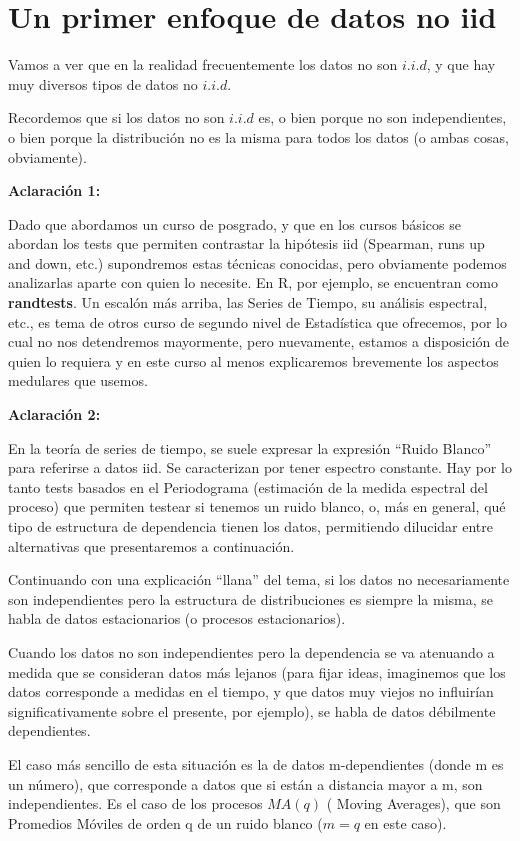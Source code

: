 \documentclass[
  oneside]{book}
\begin{document}
\section{Un primer enfoque de datos no iid}

Vamos a ver que en la realidad frecuentemente los datos no son
\(i.i.d\), y que hay muy diversos tipos de datos no \(i.i.d\).

Recordemos que si los datos no son \(i.i.d\) es, o bien porque no son
independientes, o bien porque la distribución no es la misma para todos
los datos (o ambas cosas, obviamente).

\textbf{Aclaración 1:}

Dado que abordamos un curso de posgrado, y que en los cursos básicos se
abordan los tests que permiten contrastar la hipótesis iid (Spearman,
runs up and down, etc.) supondremos estas técnicas conocidas, pero
obviamente podemos analizarlas aparte con quien lo necesite. En R, por
ejemplo, se encuentran como \textbf{randtests}. Un escalón más arriba,
las Series de Tiempo, su análisis espectral, etc., es tema de otros
curso de segundo nivel de Estadística que ofrecemos, por lo cual no nos
detendremos mayormente, pero nuevamente, estamos a disposición de quien
lo requiera y en este curso al menos explicaremos brevemente los
aspectos medulares que usemos.

\textbf{Aclaración 2:}

En la teoría de series de tiempo, se suele expresar la expresión ``Ruido
Blanco'' para referirse a datos iid. Se caracterizan por tener espectro
constante. Hay por lo tanto tests basados en el Periodograma (estimación
de la medida espectral del proceso) que permiten testear si tenemos un
ruido blanco, o, más en general, qué tipo de estructura de dependencia
tienen los datos, permitiendo dilucidar entre alternativas que
presentaremos a continuación.

Continuando con una explicación ``llana'' del tema, si los datos no
necesariamente son independientes pero la estructura de distribuciones
es siempre la misma, se habla de datos estacionarios (o procesos
estacionarios).

Cuando los datos no son independientes pero la dependencia se va
atenuando a medida que se consideran datos más lejanos (para fijar
ideas, imaginemos que los datos corresponde a medidas en el tiempo, y
que datos muy viejos no influirían significativamente sobre el presente,
por ejemplo), se habla de datos débilmente dependientes.

El caso más sencillo de esta situación es la de datos m-dependientes
(donde m es un número), que corresponde a datos que si están a distancia
mayor a m, son independientes. Es el caso de los procesos \(MA(q)\) (
Moving Averages), que son Promedios Móviles de orden q de un ruido
blanco (\(m=q\) en este caso).
\end{document}
